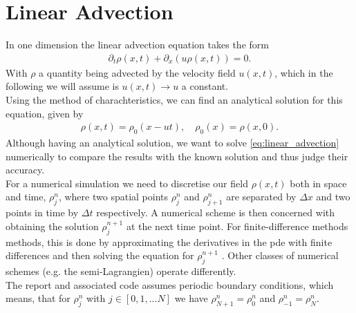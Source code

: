 \section{Linear Advection}\label{ch:linear_advection}
In one dimension the linear advection equation takes the form 
\begin{align}
\partial_t\rho(x,t) + \partial_x(u \rho(x,t)) = 0.\label{eq:linear_advection}
\end{align}
With $\rho$ a quantity being advected by the velocity field $u(x,t)$, which in the following we will assume is $u(x,t)\rightarrow u$ a constant.\\
Using the method of charachteristics, we can find an analytical solution for this equation, given by
\begin{align}
\rho(x,t) = \rho_0(x-ut),\quad \rho_0(x) = \rho(x,0).\label{eq:analytical_sol}
\end{align}
Although having an analytical solution, we want to solve \cref{eq:linear_advection} numerically to compare the results with the known solution and thus judge their accuracy. \\
For a numerical simulation we need to discretise our field $\rho(x,t)$ both in space and time, $\rho_j^n$, where two spatial points $\rho_j^n$ and $\rho_{j+1}^n$ are separated by $\Delta x$ and two points in time by $\Delta t$ respectively. A numerical scheme is then concerned with obtaining the solution $\rho_j^{n+1}$ at the next time point. For finite-difference methods  methods, this is done by approximating the derivatives in the pde with finite differences and then solving the equation for $\rho_j^{n+1}$ . Other classes of numerical schemes (e.g. the semi-Lagrangien) operate differently.\\
The report and associated code assumes periodic boundary conditions, which means, that for $\rho_j^{n}$ with $j \in [0,1,... N] $ we have $\rho_{N+1}^n=\rho_0^n$ and $\rho_{-1}^n=\rho_N^n$.